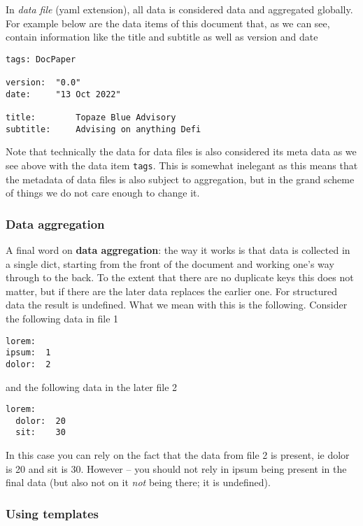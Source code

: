 \documentclass[11pt]{article}
\begin{document}
In \emph{data file} (yaml extension), all data is considered data and
aggregated globally. For example below are the data items of this
document that, as we can see, contain information like the title and
subtitle as well as version and date

\begin{verbatim}
tags: DocPaper

version:  "0.0"
date:     "13 Oct 2022"

title:        Topaze Blue Advisory
subtitle:     Advising on anything Defi
\end{verbatim}

Note that technically the data for data files is also considered its
meta data as we see above with the data item \texttt{tags}. This is
somewhat inelegant as this means that the metadata of data files is also
subject to aggregation, but in the grand scheme of things we do not care
enough to change it.

\hypertarget{data-aggregation}{%
\subsubsection{Data aggregation}\label{data-aggregation}}

A final word on \textbf{data aggregation}: the way it works is that data
is collected in a single dict, starting from the front of the document
and working one's way through to the back. To the extent that there are
no duplicate keys this does not matter, but if there are the later data
replaces the earlier one. For structured data the result is undefined.
What we mean with this is the following. Consider the following data in
file 1

\begin{verbatim}
lorem:
ipsum:  1
dolor:  2
\end{verbatim}

and the following data in the later file 2

\begin{verbatim}
lorem:
  dolor:  20
  sit:    30
\end{verbatim}

In this case you can rely on the fact that the data from file 2 is
present, ie dolor is 20 and sit is 30. However -- you should not rely in
ipsum being present in the final data (but also not on it \emph{not}
being there; it is undefined).

\hypertarget{using-templates}{%
\subsubsection{Using templates}\label{using-templates}}
\end{document}
